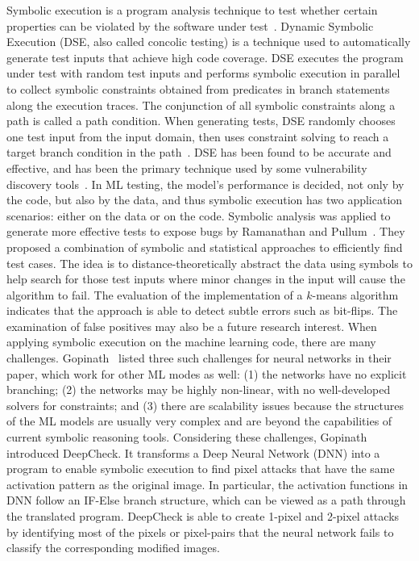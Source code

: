 Symbolic execution is a program analysis technique to test
whether certain properties can be violated by the software under test~. 
Dynamic Symbolic Execution (DSE, also called concolic testing) is a technique used to automatically generate test inputs that achieve high code coverage. 
DSE executes the program under test with random test inputs and performs symbolic execution in parallel to collect symbolic constraints obtained from predicates in branch statements along the execution traces. 
The conjunction of all symbolic constraints along a path is called a path condition. 
When generating tests, DSE randomly chooses one test input from the input domain,
then uses constraint solving to reach a target branch condition in the path~.
DSE has been found to be accurate and effective, and has been the primary technique used by some vulnerability discovery tools~.
In ML testing, the model's performance is decided, not only by the code, but also by the data, and thus symbolic execution has two application scenarios: either on the data or on the code.
Symbolic analysis was applied to generate more effective tests to expose bugs by Ramanathan and Pullum~.
They proposed a combination of symbolic and statistical approaches to efficiently find test cases.
The idea is to distance-theoretically abstract the data using symbols to help search for those test inputs where minor changes in the input will cause the algorithm to fail.
The evaluation of the implementation of a $k$-means algorithm indicates that the approach is able to detect subtle errors such as bit-flips. 
The examination of false positives may also be a future research interest.
When applying symbolic execution on the machine learning code, there are many challenges.
Gopinath~ listed three such challenges for neural networks in their paper, which work for other ML modes as well:
(1) the networks have no explicit branching;
(2) the networks may be highly non-linear, with no well-developed solvers for constraints; and 
(3) there are scalability issues because the structures of the ML models are usually very complex and are beyond the capabilities of current symbolic reasoning tools.
Considering these challenges, Gopinath~ introduced DeepCheck.
It transforms a Deep Neural Network (DNN) into a program to enable symbolic execution to find pixel attacks that have the same activation pattern as the original image.
In particular, the activation functions in DNN follow an IF-Else branch structure, which can be viewed as a path through the translated program.
DeepCheck is able to create 1-pixel and 2-pixel attacks by identifying most of the pixels or pixel-pairs that the neural network fails to classify the corresponding modified images.

